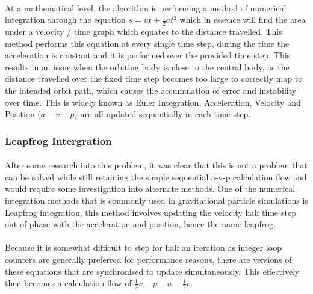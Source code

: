 \paragraph{}
At a mathematical level, the algorithm is performing a method of numerical integration through the equation $s=ut+\frac{1}{2}at^2$ which in essence will find the area under a velocity / time graph which equates to the distance travelled. This method performs this equation at every single time step, during the time the acceleration is constant and it is performed over the provided time step. This results in an issue when the orbiting body is close to the central body, as the distance travelled over the fixed time step becomes too large to correctly map to the intended orbit path, which causes the accumulation of error and instability over time. This is widely known as Euler Integration, Acceleration, Velocity and Position ($a-v-p$) are all updated sequentially in each time step.

\subsubsection{Leapfrog Intergration}
\paragraph{}
After some research into this problem, it was clear that this is not a problem that can be solved while still retaining the simple sequential a-v-p calculation flow and would require some investigation into alternate methods. One of the numerical integration methods that is commonly used in gravitational particle simulations is Leapfrog integration, this method involves updating the velocity half time step out of phase with the acceleration and position, hence the name leapfrog.

\paragraph{}
Because it is somewhat difficult to step for half an iteration as integer loop counters are generally preferred for performance reasons, there are versions of these equations that are synchronised to update simultaneously. This effectively then becomes a calculation flow of $\frac{1}{2}v-p-a-\frac{1}{2}v$.

